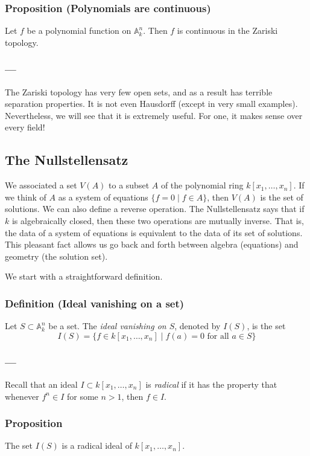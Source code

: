 \documentclass[11pt]{article}
\begin{document}
\subsubsection{Proposition (Polynomials are continuous)}
\label{sec:org43b57b4}
Let \(f\) be a polynomial function on \(\mathbb A^n_k\).
Then \(f\) is continuous in the Zariski topology.

\subsubsection*{---}
\label{sec:orga249adc}
The Zariski topology has very few open sets, and as a result has terrible separation properties.
It is not even Hausdorff (except in very small examples).
Nevertheless, we will see that it is extremely useful.
For one, it makes sense over every field!

\subsection{The Nullstellensatz}
\label{sec:org459e4f9}
We associated a set \(V(A)\) to a subset \(A\) of the polynomial ring \(k[x_1,\dots,x_n]\).
If we think of \(A\) as a system of equations \(\{f = 0 \mid f \in A\}\), then \(V(A)\) is the set of solutions.
We can also define a reverse operation.
The Nullstellensatz says that if \(k\) is algebraically closed, then these two operations are mutually inverse.
That is, the data of a system of equations is equivalent to the data of its set of solutions.
This pleasant fact allows us go back and forth between algebra (equations) and geometry (the solution set).

We start with a straightforward definition.
\subsubsection{Definition (Ideal vanishing on a set)}
\label{sec:org3a9d77f}
Let \(S \subset \mathbb A^n_k\) be a set.
The \emph{ideal vanishing on \(S\)}, denoted by \(I(S)\), is the set
\[ I(S) = \{f \in k[x_1,\dots,x_n] \mid f(a) = 0 \text{ for all } a \in S\}\]

\subsubsection*{---}
\label{sec:orgf30fb38}
Recall that an ideal \(I \subset k[x_1,\dots,x_n]\) is \emph{radical} if it has the property that whenever \(f^n \in I\) for some \(n > 1\), then \(f \in I\).
\subsubsection{Proposition}
\label{sec:org35d174c}
The set \(I(S)\) is a radical ideal of \(k[x_1,\dots,x_n]\).
\end{document}
